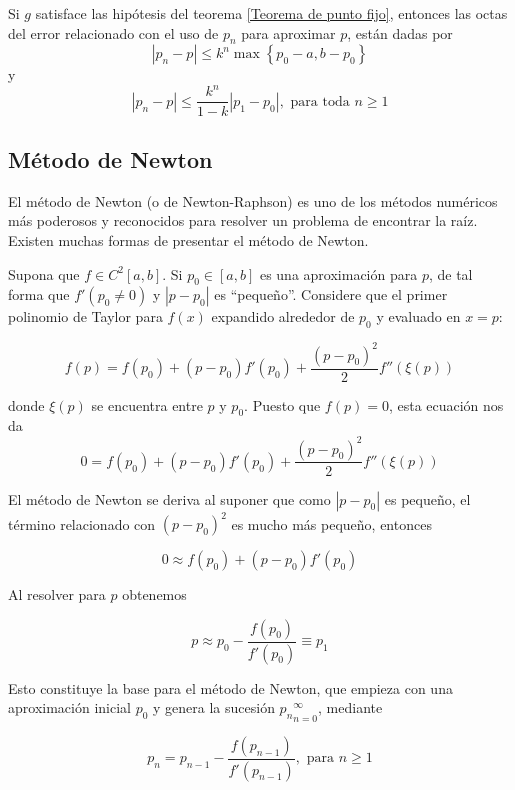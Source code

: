 \begin{remark}
    Si $g$ satisface las hipótesis del teorema \ref{Teorema de punto fijo}, entonces las octas del error relacionado con el uso de $p_n$ para aproximar $p$, están dadas por
    \begin{equation}
        |p_n - p| \leq k^n \max \left\{ p_0 - a, b - p_0 \right\}
    \end{equation}
    y
    \begin{equation}
        |p_n - p| \leq \frac{k^n}{1 - k}|p_1 - p_0|, \text{ para toda } n \geq 1
    \end{equation}
\end{remark}

\subsection{Método de Newton}

El método de Newton (o de Newton-Raphson) es uno de los métodos numéricos más poderosos y reconocidos para resolver un problema de encontrar la raíz. Existen muchas formas de presentar el método de Newton.

Supona que $f \in C^2[a, b]$. Si $p_0 \in [a, b]$ es una aproximación para $p$, de tal forma que $f'(p_0 \neq 0)$ y $|p - p_0|$ es ``pequeño''. Considere que el primer polinomio de Taylor para $f(x)$ expandido alrededor de $p_0$ y evaluado en $x = p$:

\[ f(p) = f(p_0) + (p - p_0)f'(p_0) + \frac{(p-p_0)^2}{2}f''(\xi(p)) \]

donde $\xi(p)$ se encuentra entre $p$ y $p_0$. Puesto que $f(p) = 0$, esta ecuación nos da
\[ 0 = f(p_0) + (p - p_0)f'(p_0) + \frac{(p-p_0)^2}{2}f''(\xi(p)) \]

El método de Newton se deriva al suponer que como $|p- p_0|$ es pequeño, el término relacionado con $(p - p_0)^2$ es mucho más pequeño, entonces

\[ 0 \approx f(p_0) + (p - p_0) f'(p_0)\]

Al resolver para $p$ obtenemos

\[ p \approx p_0 - \frac{f(p_0)}{f'(p_0)} \equiv p_1 \]

Esto constituye la base para el método de Newton, que empieza con una aproximación inicial $p_0$ y genera la sucesión ${p_n}_{n = 0}^\infty$, mediante

\begin{equation}
    \label{eq: Metodo de Newton}
    p_n = p_{n - 1} - \frac{f(p_{n - 1})}{f'(p_{n - 1})}, \text{ para } n \geq 1
\end{equation}


